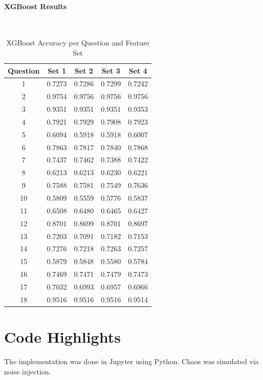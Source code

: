 \documentclass[12pt]{article}
\begin{document}
	\paragraph{XGBoost Results}\mbox{}\\
	
	\begin{table}[H]
		\centering
		\small
		\caption{XGBoost Accuracy per Question and Feature Set}
		\begin{tabular}{c|cccc}
			\toprule
			\textbf{Question} & \textbf{Set 1} & \textbf{Set 2} & \textbf{Set 3} & \textbf{Set 4} \\
			\midrule
			1  & 0.7273 & 0.7286 & 0.7299 & 0.7242 \\
			2  & 0.9754 & 0.9756 & 0.9756 & 0.9756 \\
			3  & 0.9351 & 0.9351 & 0.9351 & 0.9353 \\
			4  & 0.7921 & 0.7929 & 0.7908 & 0.7923 \\
			5  & 0.6094 & 0.5918 & 0.5918 & 0.6007 \\
			6  & 0.7863 & 0.7817 & 0.7840 & 0.7868 \\
			7  & 0.7437 & 0.7462 & 0.7388 & 0.7422 \\
			8  & 0.6213 & 0.6213 & 0.6230 & 0.6221 \\
			9  & 0.7588 & 0.7581 & 0.7549 & 0.7636 \\
			10 & 0.5809 & 0.5559 & 0.5776 & 0.5837 \\
			11 & 0.6508 & 0.6480 & 0.6465 & 0.6427 \\
			12 & 0.8701 & 0.8699 & 0.8701 & 0.8697 \\
			13 & 0.7203 & 0.7091 & 0.7182 & 0.7153 \\
			14 & 0.7276 & 0.7218 & 0.7263 & 0.7257 \\
			15 & 0.5879 & 0.5848 & 0.5580 & 0.5784 \\
			16 & 0.7469 & 0.7471 & 0.7479 & 0.7473 \\
			17 & 0.7032 & 0.6993 & 0.6957 & 0.6966 \\
			18 & 0.9516 & 0.9516 & 0.9516 & 0.9514 \\
			\bottomrule
		\end{tabular}
		\label{tab:xgb_metrics}
	\end{table}
	
	\section{Code Highlights}
	The implementation was done in Jupyter using Python. Chaos was simulated via noise injection.
	
\end{document}
